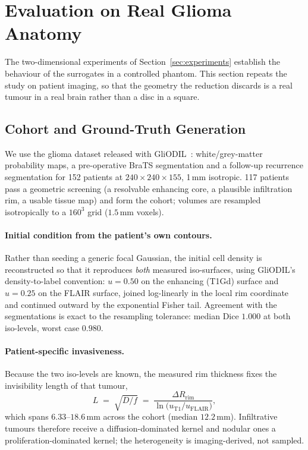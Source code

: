 
\section{Evaluation on Real Glioma Anatomy}
\label{sec:realdata}

The two-dimensional experiments of Section~\ref{sec:experiments} establish the
behaviour of the surrogates in a controlled phantom. This section repeats the
study on patient imaging, so that the geometry the reduction discards is a real
tumour in a real brain rather than a disc in a square.

\subsection{Cohort and Ground-Truth Generation}

We use the glioma dataset released with GliODIL~\cite{Balcerak2025GliODIL}:
white/grey-matter probability maps, a pre-operative BraTS segmentation and a
follow-up recurrence segmentation for 152 patients at $240\times240\times155$,
1\,mm isotropic. 117 patients pass a geometric screening (a resolvable
enhancing core, a plausible infiltration rim, a usable tissue map) and form the
cohort; volumes are resampled isotropically to a $160^{3}$ grid
($1.5$\,mm voxels).

\paragraph{Initial condition from the patient's own contours.}
Rather than seeding a generic focal Gaussian, the initial cell density is
reconstructed so that it reproduces \emph{both} measured iso-surfaces, using
GliODIL's density-to-label convention: $u=0.50$ on the enhancing (T1Gd) surface
and $u=0.25$ on the FLAIR surface, joined log-linearly in the local rim
coordinate and continued outward by the exponential Fisher tail. Agreement with
the segmentations is exact to the resampling tolerance: median Dice $1.000$ at
both iso-levels, worst case $0.980$.

\paragraph{Patient-specific invasiveness.}
Because the two iso-levels are known, the measured rim thickness fixes the
invisibility length of that tumour,
\begin{equation}
\label{eq:Lrim}
L \;=\; \sqrt{D/f} \;=\; \frac{\Delta R_{\text{rim}}}{\ln\bigl(u_{\mathrm{T1}}/u_{\mathrm{FLAIR}}\bigr)},
\end{equation}
which spans $6.33$--$18.6$\,mm across the cohort (median
$12.2$\,mm). Infiltrative tumours therefore receive a diffusion-dominated
kernel and nodular ones a proliferation-dominated kernel; the heterogeneity is
imaging-derived, not sampled.


